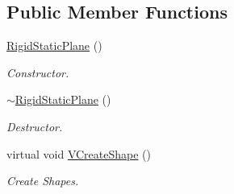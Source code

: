 \subsection*{Public Member Functions}
\begin{DoxyCompactItemize}
\item 
\hypertarget{classContent_1_1Actor_1_1Admin_1_1RigidStaticPlane_a9e6196696dd4220e18b01a2ba00ef3bf}{
\hyperlink{classContent_1_1Actor_1_1Admin_1_1RigidStaticPlane_a9e6196696dd4220e18b01a2ba00ef3bf}{RigidStaticPlane} ()}
\label{classContent_1_1Actor_1_1Admin_1_1RigidStaticPlane_a9e6196696dd4220e18b01a2ba00ef3bf}

\begin{DoxyCompactList}\small\item\em Constructor. \item\end{DoxyCompactList}\item 
\hypertarget{classContent_1_1Actor_1_1Admin_1_1RigidStaticPlane_aeedb1f483388baa4f99ba91b86dc5b90}{
\hyperlink{classContent_1_1Actor_1_1Admin_1_1RigidStaticPlane_aeedb1f483388baa4f99ba91b86dc5b90}{$\sim$RigidStaticPlane} ()}
\label{classContent_1_1Actor_1_1Admin_1_1RigidStaticPlane_aeedb1f483388baa4f99ba91b86dc5b90}

\begin{DoxyCompactList}\small\item\em Destructor. \item\end{DoxyCompactList}\item 
\hypertarget{classContent_1_1Actor_1_1Admin_1_1RigidStaticPlane_a2ba2fb467598c159d1527ad3f64191be}{
virtual void \hyperlink{classContent_1_1Actor_1_1Admin_1_1RigidStaticPlane_a2ba2fb467598c159d1527ad3f64191be}{VCreateShape} ()}
\label{classContent_1_1Actor_1_1Admin_1_1RigidStaticPlane_a2ba2fb467598c159d1527ad3f64191be}

\begin{DoxyCompactList}\small\item\em Create Shapes. \item\end{DoxyCompactList}\end{DoxyCompactItemize}
